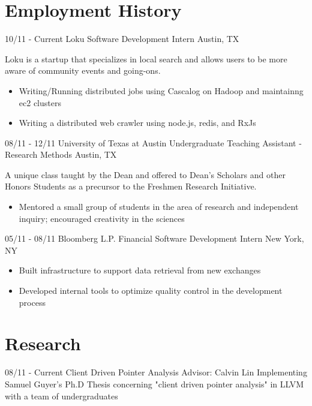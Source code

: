 \documentclass[11pt,letter,sans]{moderncv}
\begin{document}
\maketitle

\section{Employment History}

\cventry
  {10/11 - Current}
  {Loku}
  {Software Development Intern}
  {Austin, TX}
  {}
  {Loku is a startup that specializes in local search and allows users to be
  more aware of community events and going-ons.
  \begin{itemize}
    \item Writing/Running distributed jobs using Cascalog on Hadoop and
      maintainng ec2 clusters
    \item Writing a distributed web crawler using node.js, redis, and RxJs
\end{itemize}}

\cventry
{08/11 - 12/11}
{University of Texas at Austin}
{Undergraduate Teaching Assistant - Research Methods}
{Austin, TX}
  {}
  {A unique class taught by the Dean and offered to Dean's Scholars and other
    Honors Students as a precursor to the Freshmen Research Initiative.
  \begin{itemize}
    \item Mentored a small group of students in the area of research and
      independent inquiry; encouraged creativity in the sciences
\end{itemize}}

\cventry
{05/11 - 08/11}
{Bloomberg L.P.}
{Financial Software Development Intern}
{New York, NY}
  {}
  {
  \begin{itemize}
    \item Built infrastructure to support data retrieval from new exchanges
    \item Developed internal tools to optimize quality control in the
      development process
\end{itemize}}

\section{Research}
\cventry
{08/11 - Current}
{Client Driven Pointer Analysis}
{Advisor: Calvin Lin}
{}
  {}
  {Implementing Samuel Guyer's Ph.D Thesis concerning "client driven pointer
    analysis" in LLVM with a team of undergraduates
  }
\end{document}
